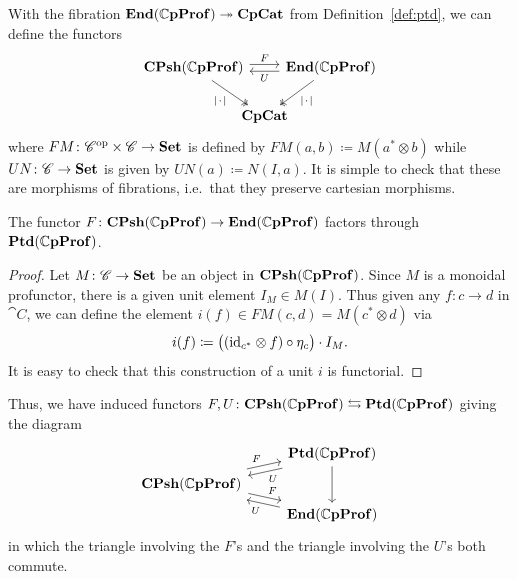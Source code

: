 \documentclass[11pt,oneside,article]{memoir}
\begin{document}
With the fibration $\mathbf{End}(\mathbb{C}\mathbf{pProf})\twoheadrightarrow\mathbf{CpCat}$ from Definition~\ref{def:ptd}, we can define the
functors
\begin{equation} \begin{tikzcd}[column sep=-1em]
    \label{eqn:functors_1C_CC}
  \CPsh(\dCompProf) \ar[rr,shift left,"F"] \ar[dr,two heads,"\MOb"']
    && \End(\dCompProf) \ar[ll,shift left,"U"] \ar[dl,two heads,"\MOb"] \\
  & \CompCat &
\end{tikzcd} \end{equation}
where $FM\colon{\mathscr{C}}^{\text{op}}\times \mathscr{C}\to\mathbf{Set}$ is defined by $FM(a,b)\coloneqq M(a^*\otimes b)$
while $UN\colon \mathscr{C}\to\mathbf{Set}$ is given by $UN(a)\coloneqq N(I,a)$. It is simple to check that
these are morphisms of fibrations, i.e.\ that they preserve cartesian morphisms.

\begin{proposition}
    \label{Prop:canonical unit}
  The functor $F\colon\mathbf{CPsh}(\mathbb{C}\mathbf{pProf})\to\mathbf{End}(\mathbb{C}\mathbf{pProf})$ factors through $\mathbf{Ptd}(\mathbb{C}\mathbf{pProf})$.
\end{proposition}
\begin{proof}
  Let $M\colon \mathscr{C}\to\mathbf{Set}$ be an object in $\mathbf{CPsh}(\mathbb{C}\mathbf{pProf})$. Since $M$ is a monoidal
  profunctor, there is a given unit element $I_M\in M(I)$. Thus given any $f\colon c\to d$ in $
  \cat{C}$, we can define the element $i(f)\in FM(c,d)=M(c^*\otimes d)$ via
  \[
    i(f)\coloneqq\big((\mathrm{id}_{c^*}\otimes f)\circ\eta_c\big)\cdot I_M.
  \]
  It is easy to check that this construction of a unit $i$ is functorial.
\end{proof}

Thus, we have induced functors $F,U\colon\mathbf{CPsh}(\mathbb{C}\mathbf{pProf})\leftrightarrows\mathbf{Ptd}(\mathbb{C}\mathbf{pProf})$ giving
the diagram
\begin{equation} \begin{tikzcd}[row sep=tiny]
    \label{eqn:ptd_functors_1C_CC}
  & \Ptd(\dCompProf) \ar[dd] \ar[dl,shift left,"U"] \\
  \CPsh(\dCompProf) \ar[ur,shift left,"F"] \ar[dr,shift left,"F"] & \\
  & \End(\dCompProf) \ar[ul,shift left,"U"]
\end{tikzcd} \end{equation}
in which the triangle involving the $F$'s and the triangle involving the $U$'s both commute.
\end{document}
